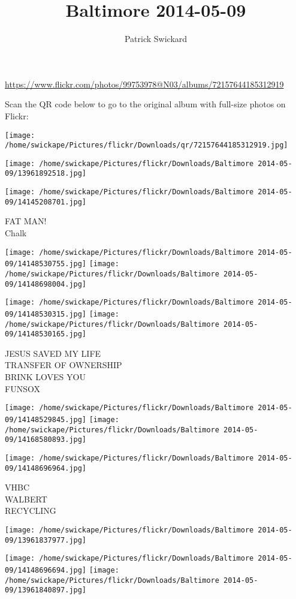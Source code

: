 \documentclass[10pt,letterpaper]{article}
\title{Baltimore 2014-05-09}
\author{Patrick Swickard}
\date{}
\begin{document}
\maketitle

\url{https://www.flickr.com/photos/99753978@N03/albums/72157644185312919}

Scan the QR code below to go to the original album with full-size photos on Flickr:

\texttt{[image: /home/swickape/Pictures/flickr/Downloads/qr/72157644185312919.jpg]}
\pagebreak

\texttt{[image: /home/swickape/Pictures/flickr/Downloads/Baltimore 2014-05-09/13961892518.jpg]}

\vspace{0.25in}
\texttt{[image: /home/swickape/Pictures/flickr/Downloads/Baltimore 2014-05-09/14145208701.jpg]}

FAT MAN!\\
Chalk
\pagebreak

\texttt{[image: /home/swickape/Pictures/flickr/Downloads/Baltimore 2014-05-09/14148530755.jpg]}
\texttt{[image: /home/swickape/Pictures/flickr/Downloads/Baltimore 2014-05-09/14148698004.jpg]}

\texttt{[image: /home/swickape/Pictures/flickr/Downloads/Baltimore 2014-05-09/14148530315.jpg]}
\texttt{[image: /home/swickape/Pictures/flickr/Downloads/Baltimore 2014-05-09/14148530165.jpg]}

JESUS SAVED MY LIFE\\
TRANSFER OF OWNERSHIP\\
BRINK LOVES YOU\\
FUNSOX
\pagebreak

\texttt{[image: /home/swickape/Pictures/flickr/Downloads/Baltimore 2014-05-09/14148529845.jpg]}
\texttt{[image: /home/swickape/Pictures/flickr/Downloads/Baltimore 2014-05-09/14168580893.jpg]}

\texttt{[image: /home/swickape/Pictures/flickr/Downloads/Baltimore 2014-05-09/14148696964.jpg]}

VHBC\\
WALBERT\\
RECYCLING
\pagebreak

\texttt{[image: /home/swickape/Pictures/flickr/Downloads/Baltimore 2014-05-09/13961837977.jpg]}

\vspace{0.25in}
\texttt{[image: /home/swickape/Pictures/flickr/Downloads/Baltimore 2014-05-09/14148696694.jpg]}
\texttt{[image: /home/swickape/Pictures/flickr/Downloads/Baltimore 2014-05-09/13961840897.jpg]}
\end{document}
